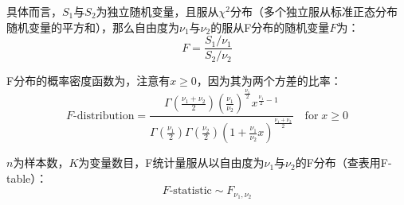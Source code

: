 \documentclass[11pt]{article}
\begin{document}
具体而言，$S_1$与$S_2$为独立随机变量，且服从$\chi^2$分布（多个独立服从标准正态分布随机变量的平方和），那么自由度为$\nu_1$与$\nu_2$的服从F分布的随机变量$F$为：
\begin{equation*}
    F = \frac{S_1/\nu_1}{S_2/\nu_2}
\end{equation*}

F分布的概率密度函数为，注意有$x\geq 0$，因为其为两个方差的比率：
\begin{equation*}
    F\text{-distribution} = \frac{\Gamma\left(\frac{\nu_1+\nu_2}{2}\right)\left(\frac{\nu_1}{\nu_2}\right)^{\frac{\nu_1}{2}} x^{\frac{\nu_1}{2}-1}}{\Gamma\left(\frac{\nu_1}{2}\right)\Gamma\left(\frac{\nu_2}{2}\right)\left(1+\frac{\nu_1}{\nu_2}x\right)^{\frac{\nu_1+\nu_2}{2}}} \quad \text{for}\; x\geq 0
\end{equation*}

$n$为样本数，$K$为变量数目，F统计量服从以自由度为$\nu_1$与$\nu_2$的F分布（查表用F-table）：
\begin{equation*}
    F\text{-statistic} \sim F_{\nu_1,\nu_2}
\end{equation*}
\end{document}
